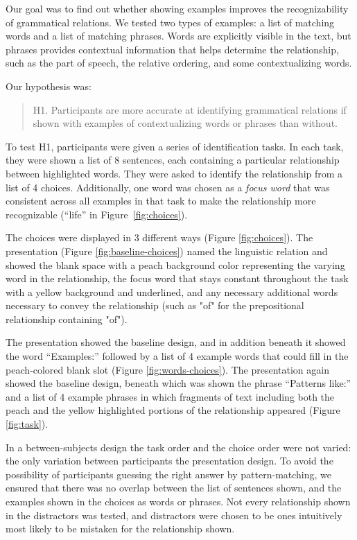 

Our goal was to find out whether showing examples improves the recognizability of grammatical relations. We tested two types of examples: a list of matching words and a list of matching phrases. Words are explicitly visible in the text, but phrases provides contextual information that helps determine the relationship, such as the part of speech, the relative ordering, and some contextualizing words.

Our hypothesis was:
\begin{quote}
	H1. Participants are more accurate at identifying grammatical relations if shown with examples of contextualizing words or phrases than without.
\end{quote}

To test H1, participants were given a series of identification tasks. In each task, they were shown a list of 8 sentences, each containing a particular relationship between highlighted words. They were asked to identify the relationship from a list of 4 choices.  Additionally, one word was chosen as a \emph{focus word} that was consistent across all examples in that task to make the relationship more recognizable (``life'' in Figure~\ref{fig:choices}).

The choices were displayed in 3 different ways (Figure \ref{fig:choices}).  The  presentation 
(Figure \ref{fig:baseline-choices}) named the linguistic relation and showed the blank space with a peach background color representing the varying word in the relationship, the focus word that stays constant throughout the task with a yellow background and underlined, and any necessary additional words necessary to convey the relationship (such as "of" for the prepositional relationship containing "of").
 
The  presentation showed the baseline design, and in addition beneath it showed the word ``Examples:'' followed by a list of 4 example words that could fill in the peach-colored blank slot (Figure \ref{fig:words-choices}).   The  presentation again showed the baseline design, beneath which was shown the phrase ``Patterns like:'' and a list of 4 example phrases in which fragments of text including both the peach and the yellow highlighted portions of the  relationship appeared (Figure \ref{fig:task}).

In a between-subjects design the task order and the choice order were not varied: the only variation between participants the presentation design.  
To avoid the possibility of participants guessing the right answer by pattern-matching, we ensured that there was no overlap between the list of sentences shown, and the examples shown in the choices as words or phrases. Not every relationship shown in the distractors was tested, and distractors were chosen to be ones intuitively most likely to be mistaken for  the relationship shown.

